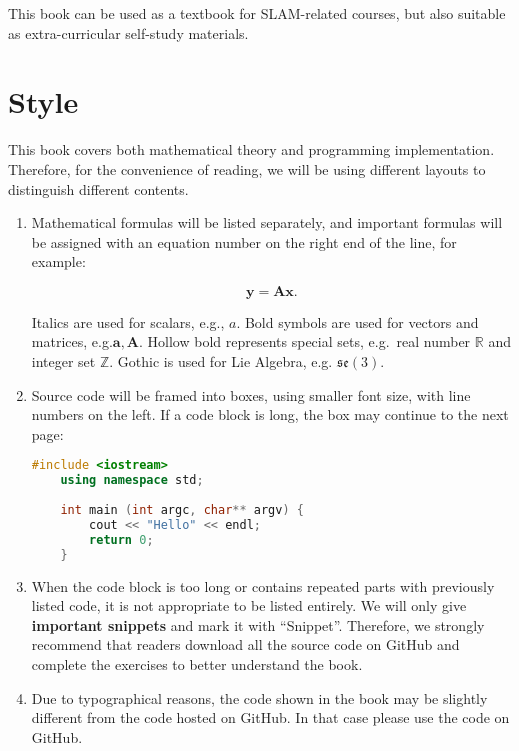 This book can be used as a textbook for SLAM-related courses, but also suitable as extra-curricular self-study materials.

\section{Style}

This book covers both mathematical theory and programming implementation. Therefore, for the convenience of reading, we will be using different layouts to distinguish different contents.

\begin{enumerate}
	\item Mathematical formulas will be listed separately, and important formulas will be assigned with an equation number on the right end of the line, for example:
	
	\begin{equation}
	\mathbf{y} =\mathbf{A}\mathbf{x}.
	\end{equation}
	
	Italics are used for scalars, e.g., $a$. Bold symbols are used for vectors and matrices, e.g.$\mathbf{a}, \mathbf{A}$. Hollow bold represents special sets, e.g.\ real number $\mathbb{R}$ and integer set $\mathbb{Z}$. Gothic is used for Lie Algebra, e.g. $\mathfrak{se}(3)$.
	
	\item Source code will be framed into boxes, using smaller font size, with line numbers on the left. If a code block is long, the box may continue to the next page:
	\begin{lstlisting}[language=C++]
	#include <iostream>
	using namespace std;
	
	int main (int argc, char** argv) {
		cout << "Hello" << endl;
		return 0;
	}
	\end{lstlisting}
	
	\item When the code block is too long or contains repeated parts with previously listed code, it is not appropriate to be listed entirely. We will only give \textbf{important snippets} and mark it with ``Snippet''. Therefore, we strongly recommend that readers download all the source code on GitHub and complete the exercises to better understand the book.
	
	\item Due to typographical reasons, the code shown in the book may be slightly different from the code hosted on GitHub. In that case please use the code on GitHub.
	

\end{enumerate}
